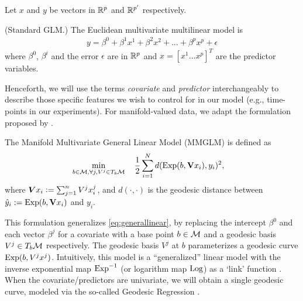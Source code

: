 Let $x$ and $y$ be vectors in $\mathbb{R}^p$ and $\mathbb{R}^{p'}$ respectively.
\begin{definition} (Standard GLM.) The Euclidean multivariate multilinear model is 
{\begin{equation}
	\begin{split}
	y  = \beta^0 + \beta^{1} x^{1} + \beta^{2} x^{2} + \ldots +\beta^{p} x^{p} + \epsilon
	\end{split}
	\label{eq:generallinear}
	\end{equation}}
where $\beta^0$, $\beta^{i}$ and the error $\epsilon$ are in $\mathbb{R}^{p}$ and $x = [x^1 \ldots x^p ]^{T}$ are the 
predictor variables.
\end{definition}
Henceforth, we will use the terms \textit{covariate} and \textit{predictor} interchangeably to describe those specific features we wish to control for in our model (e.g., time-points in our experiments).
For manifold-valued data, we adapt the formulation proposed by \cite{hjkimcvpr2014}.
\begin{definition} The Manifold Multivariate General Linear Model (MMGLM) is defined as 
{\begin{equation}
	\begin{split}
	&\min_{b \in \Mc, \forall j, V^j \in T_{b}\Mc} \quad \frac{1}{2} %
	\sum_{i=1}^{N}d(\EXP(b, \textbf{V} x_i),y_i)^2,
	\end{split}
	\label{eq:multigr}
	\end{equation}}
where $\bm{V} x_i \mathrel{\mathop:}= \sum_{j=1}^{n}V^j x_{i}^{j}$, and $d(\cdot, \cdot)$ is the geodesic distance between $\hat{y}_i:=\text{Exp}(b, \textbf{V} x_i)$ and $y_i$. 
\end{definition}
This formulation generalizes \eqref{eq:generallinear}, by replacing the intercept $\beta^0$ and each vector $\beta^j$ for a covariate with a 
base point $b \in \mathcal{M}$ and a geodesic basis $V^j \in T_{b}\mathcal{M}$ respectively. The geodesic basis $V^j$ at $b$ parameterizes a geodesic curve $\text{Exp}(b,V^jx^j)$.
Intuitively, this model is a ``generalized'' linear model with the inverse exponential map $\text{Exp}^{-1}$ (or logarithm map $\text{Log}$) as a 
`link' function \citep{hjkimcvpr2014,cornea2016regression}. When the covariate/predictors are univariate, we will obtain a single geodesic curve, modeled via 
the so-called Geodesic Regression \citep{fletcher2013geodesic}.

